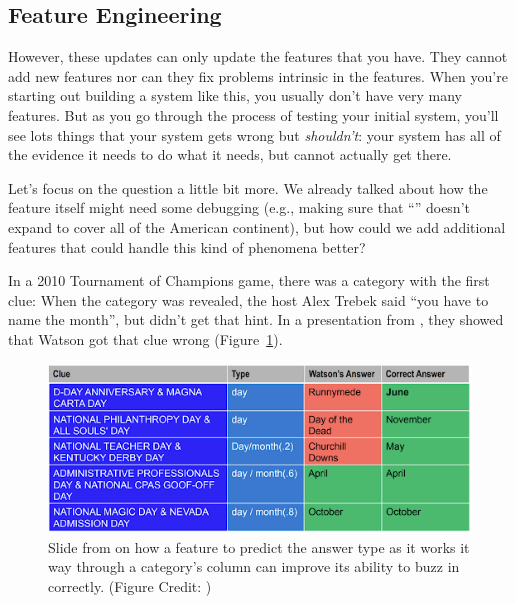 \subsection{Feature Engineering}
\label{sec:watson:feature-engineering}

However, these updates can only update the features that you have.
%
They cannot add new features nor can they fix problems intrinsic in the
features.
%
When you're starting out building a system like this, you usually
don't have very many features.
%
But as you go through the process of testing your initial system, you'll see
lots things that your system gets wrong but \emph{shouldn't}: your system has
all of the evidence it needs to do what it needs, but cannot actually get
there.

Let's focus on the  question a little bit more.
%
We already talked about how the feature itself might need some debugging
(e.g., making sure that ``'' doesn't expand to cover all of the
American continent), but how could we add additional features that could
handle this kind of phenomena better?

In a 2010 Tournament of Champions game, there was a category with the first clue:
%
%
When the category was revealed, the host Alex Trebek said ``you have to name
the month'', but \watson{} didn't get that hint.
%
In a presentation from , they showed that Watson got that clue
wrong (Figure~\ref{fig:watson:bad-month}).

\begin{figure}
  \begin{center}
    \includegraphics[width=0.8\linewidth]{figures/external/ibm_watson_feature}
  \end{center}
  \caption{Slide from  \watson{} on how a feature to predict the
    answer type as it works it way through a category's column can improve its
    ability to buzz in correctly.  (Figure Credit: )}
  \label{fig:watson:bad-month}
\end{figure}


